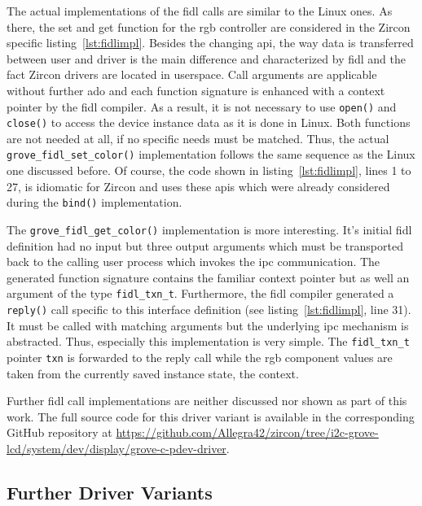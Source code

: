 %
\newpage
The actual implementations of the \ac{fidl} calls are similar to the Linux ones.
As there, the set and get function for the \ac{rgb} controller are considered in the Zircon specific listing~\ref{lst:fidlimpl}.
Besides the changing \ac{api}, the way data is transferred between user and driver is the main difference and characterized by \ac{fidl} and the fact Zircon drivers are located in userspace.
Call arguments are applicable without further ado and each function signature is enhanced with a context pointer by the \ac{fidl} compiler.
As a result, it is not necessary to use \texttt{open()} and \texttt{close()} to access the device instance data as it is done in Linux.
Both functions are not needed at all, if no specific needs must be matched.
Thus, the actual \texttt{grove_fidl_set_color()} implementation follows the same sequence as the Linux one discussed before.
Of course, the code shown in listing~\ref{lst:fidlimpl}, lines 1 to 27, is idiomatic for Zircon and uses these \acp{api} which were already considered during the \texttt{bind()} implementation.

The \texttt{grove_fidl_get_color()} implementation is more interesting.
It's initial \ac{fidl} definition had no input but three output arguments which must be transported back to the calling user process which invokes the \ac{ipc} communication.
The generated function signature contains the familiar context pointer but as well an argument of the type \texttt{fidl_txn_t}.
Furthermore, the \ac{fidl} compiler generated a \texttt{reply()} call specific to this interface definition (see listing~\ref{lst:fidlimpl}, line 31).
It must be called with matching arguments but the underlying \ac{ipc} mechanism is abstracted.
Thus, especially this implementation is very simple.
The \texttt{fidl_txn_t} pointer \texttt{txn} is forwarded to the reply call while the \ac{rgb} component values are taken from the currently saved instance state, the context.

Further \ac{fidl} call implementations are neither discussed nor shown as part of this work.
The full source code for this driver variant is available in the corresponding GitHub repository at \url{https://github.com/Allegra42/zircon/tree/i2c-grove-lcd/system/dev/display/grove-c-pdev-driver}.


\subsection{Further Driver Variants}

